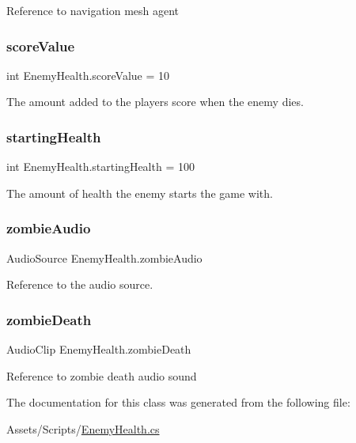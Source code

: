Reference to navigation mesh agent \mbox{\label{class_enemy_health_aeab937df3d3e723455502c690d811691}} 
\subsubsection{\texorpdfstring{scoreValue}{scoreValue}}
{\footnotesize\ttfamily int Enemy\+Health.\+score\+Value = 10}

The amount added to the player\textquotesingle{}s score when the enemy dies. \mbox{\label{class_enemy_health_a38679a6db9f4c1a03512494520bd7016}} 
\subsubsection{\texorpdfstring{startingHealth}{startingHealth}}
{\footnotesize\ttfamily int Enemy\+Health.\+starting\+Health = 100}

The amount of health the enemy starts the game with. \mbox{\label{class_enemy_health_a2004b2007b08fd455886109e50078c6d}} 
\subsubsection{\texorpdfstring{zombieAudio}{zombieAudio}}
{\footnotesize\ttfamily Audio\+Source Enemy\+Health.\+zombie\+Audio\hspace{0.3cm}{\ttfamily [private]}}

Reference to the audio source. \mbox{\label{class_enemy_health_ae5142bed0489f598a666d283d7d6a311}} 
\subsubsection{\texorpdfstring{zombieDeath}{zombieDeath}}
{\footnotesize\ttfamily Audio\+Clip Enemy\+Health.\+zombie\+Death}

Reference to zombie death audio sound 

The documentation for this class was generated from the following file\+:\begin{DoxyCompactItemize}
\item 
Assets/\+Scripts/\mbox{\hyperlink{_enemy_health_8cs}{Enemy\+Health.\+cs}}\end{DoxyCompactItemize}
